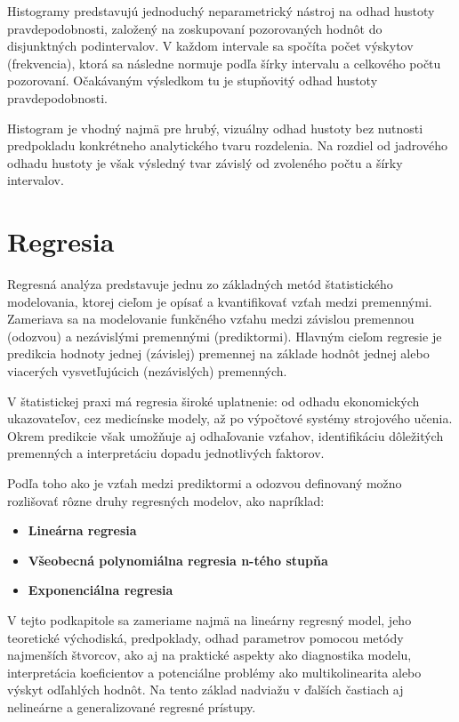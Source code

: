 Histogramy predstavujú jednoduchý neparametrický nástroj na odhad hustoty pravdepodobnosti, založený na zoskupovaní pozorovaných hodnôt do disjunktných podintervalov. V každom intervale sa spočíta počet výskytov (frekvencia), ktorá sa následne normuje podľa šírky intervalu a celkového počtu pozorovaní. Očakávaným výsledkom tu je stupňovitý odhad hustoty pravdepodobnosti.

Histogram je vhodný najmä pre hrubý, vizuálny odhad hustoty bez nutnosti predpokladu konkrétneho analytického tvaru rozdelenia. Na rozdiel od jadrového odhadu hustoty je však výsledný tvar závislý od zvoleného počtu a šírky intervalov.

\section{Regresia}\label{sec:regresia}

Regresná analýza predstavuje jednu zo základných metód štatistického modelovania, ktorej cieľom je opísať a kvantifikovať vzťah medzi premennými. Zameriava sa na modelovanie funkčného vzťahu medzi závislou premennou (odozvou) a nezávislými premennými (prediktormi). Hlavným cieľom regresie je predikcia hodnoty jednej (závislej) premennej na základe hodnôt jednej alebo viacerých vysvetľujúcich (nezávislých) premenných.

V štatistickej praxi má regresia široké uplatnenie: od odhadu ekonomických ukazovateľov, cez medicínske modely, až po výpočtové systémy strojového učenia. Okrem predikcie však umožňuje aj odhaľovanie vzťahov, identifikáciu dôležitých premenných a interpretáciu dopadu jednotlivých faktorov.

Podľa toho ako je vzťah medzi prediktormi a odozvou definovaný možno rozlišovať rôzne druhy regresných modelov, ako napríklad:
\begin{itemize}
  \item \textbf{Lineárna regresia}
  \item \textbf{Všeobecná polynomiálna regresia n-tého stupňa}
  \item \textbf{Exponenciálna regresia}
\end{itemize}

V tejto podkapitole sa zameriame najmä na lineárny regresný model, jeho teoretické východiská, predpoklady, odhad parametrov pomocou metódy najmenších štvorcov, ako aj na praktické aspekty ako diagnostika modelu, interpretácia koeficientov a potenciálne problémy ako multikolinearita alebo výskyt odľahlých hodnôt. Na tento základ nadviažu v ďalších častiach aj nelineárne a generalizované regresné prístupy.

